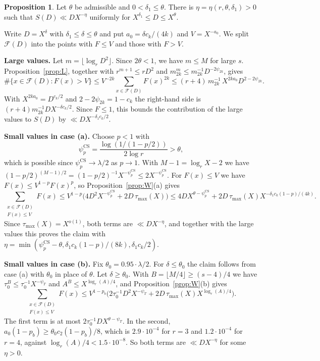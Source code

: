 \documentclass[11pt]{amsart}
\makeatletter
\theoremstyle{definition}
\newtheorem{proposition}[theorem]{Proposition}
\numberwithin{equation}{section}
\renewenvironment{proof}[1][\proofname]{\par\pushQED{\qed}\normalfont\topsep6\p@\@plus6\p@\relax\trivlist\item[\hskip\labelsep\upshape#1.]\ignorespaces}{\popQED\endtrivlist\@endpefalse}
\newcommand{\FF}{\mathscr{F}}
\newcommand{\tmax}{\tau_{\max}}
\makeatother
\begin{document}
\begin{proposition}\label{prop:dyadic}
Let $\theta$ be admissible and $0<\delta_1\le\theta$. There is $\eta=\eta(r,\theta,\delta_1)>0$ such that $S(D)\ll DX^{-\eta}$ uniformly for $X^{\delta_1}\le D\le X^{\theta}$.
\end{proposition}

\begin{proof}
Write $D=X^{\delta}$ with $\delta_1\le\delta\le\theta$ and put $a_0=\delta c_k/(4k)$ and $V=X^{-a_0}$. We split $\FF(D)$ into the points with $F\le V$ and those with $F>V$.

\textbf{Large values.} Let $m=\lfloor\log_rD^2\rfloor$. Since $2\theta<1$, we have $m\le M$ for large $s$. Proposition~\ref{prop:L}, together with $r^{m+1}\le rD^2$ and $m_{2k}^m\le m_{2k}^{-1}D^{-2\psi_{2k}}$, gives
\[
\#\{x\in\FF(D):F(x)>V\}\le V^{-2k}\sum_{x\in\FF(D)}F(x)^{2k}\le(r+4)\,m_{2k}^{-1}\,X^{2ka_0}D^{2-2\psi_{2k}}.
\]
With $X^{2ka_0}=D^{c_k/2}$ and $2-2\psi_{2k}=1-c_k$ the right-hand side is $(r+4)m_{2k}^{-1}DX^{-\delta c_k/2}$. Since $F\le1$, this bounds the contribution of the large values to $S(D)$ by $\ll DX^{-\delta_1c_k/2}$.

\textbf{Small values in case (a).} Choose $p<1$ with
\[
\psi^{\mathrm{CS}}_p=\frac{\log(1/(1-p/2))}{2\log r}>\theta,
\]
which is possible since $\psi^{\mathrm{CS}}_p\to\lambda/2$ as $p\to1$. With $M-1=\log_rX-2$ we have $(1-p/2)^{(M-1)/2}=(1-p/2)^{-1}X^{-\psi^{\mathrm{CS}}_p}\le2X^{-\psi^{\mathrm{CS}}_p}$. For $F(x)\le V$ we have $F(x)\le V^{1-p}F(x)^p$, so Proposition~\ref{prop:W}(a) gives
\[
\sum_{\substack{x\in\FF(D)\\F(x)\le V}}F(x)\le V^{1-p}\bigl(4D^2X^{-\psi^{\mathrm{CS}}_p}+2D\,\tmax(X)\bigr)\le4DX^{\theta-\psi^{\mathrm{CS}}_p}+2D\,\tmax(X)X^{-\delta_1c_k(1-p)/(4k)}.
\]
Since $\tmax(X)=X^{o(1)}$, both terms are $\ll DX^{-\eta}$, and together with the large values this proves the claim with $\eta=\min(\psi^{\mathrm{CS}}_p-\theta,\delta_1c_k(1-p)/(8k),\delta_1c_k/2)$.

\textbf{Small values in case (b).} Fix $\theta_0=0.95\cdot\lambda/2$. For $\delta\le\theta_0$ the claim follows from case (a) with $\theta_0$ in place of $\theta$. Let $\delta\ge\theta_0$. With $B=\lfloor M/4\rfloor\ge(s-4)/4$ we have $\tau_0^B\le\tau_0^{-1}X^{-\psi_T}$ and $A^B\le X^{\log_r(A)/4}$, and Proposition~\ref{prop:W}(b) gives
\[
\sum_{\substack{x\in\FF(D)\\F(x)\le V}}F(x)\le V^{1-p_b}\bigl(2\tau_0^{-1}D^2X^{-\psi_T}+2D\,\tmax(X)X^{\log_r(A)/4}\bigr).
\]
The first term is at most $2\tau_0^{-1}DX^{\theta-\psi_T}$. In the second, $a_0(1-p_b)\ge\theta_0c_2(1-p_b)/8$, which is $2.9\cdot10^{-4}$ for $r=3$ and $1.2\cdot10^{-4}$ for $r=4$, against $\log_r(A)/4<1.5\cdot10^{-8}$. So both terms are $\ll DX^{-\eta}$ for some $\eta>0$.
\end{proof}
\end{document}

